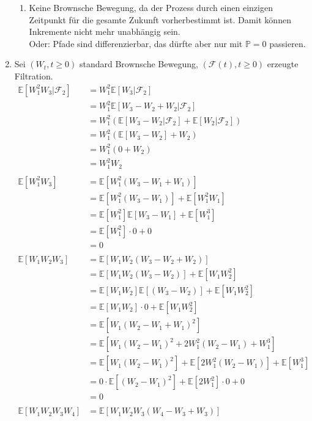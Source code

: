 \documentclass[a4paper,11pt,notitlepage,fullpage]{article}
\newcommand{\E}{\mathbb{E}}
\newcommand{\p}{\mathbb{P}}
\newcommand{\F}{\mathcal{F}}
\begin{document}
\begin{enumerate}
\begin{enumerate}
\item Keine Brownsche Bewegung, da der Prozess durch einen einzigen Zeitpunkt für die gesamte Zukunft vorherbestimmt ist. Damit können Inkremente nicht mehr unabhängig sein.\\
Oder: Pfade sind differenzierbar, das dürfte aber nur mit $\p=0$ passieren.
\end{enumerate}

\item Sei $(W_t, t\geq0)$ standard Brownsche Bewegung, $(\F(t), t\geq0)$ erzeugte Filtration.
\begin{align*}
\E[W_1^2W_3 | \F_2] &= W_1^2\E[W_3 | \F_2]  \\
&= W_1^2\E[W_3 -W_2 +W_2 | \F_2]  \\
&= W_1^2(\E[W_3 -W_2 | \F_2] +\E[W_2 | \F_2])  \\
&= W_1^2(\E[W_3 -W_2] +W_2)  \\
&= W_1^2(0 +W_2)  \\
&= W_1^2W_2  \\
\\
\E[W_1^2W_3] &= \E[W_1^2(W_3-W_1+W_1)]  \\
&= \E[W_1^2(W_3-W_1)]+\E[W_1^2W_1]  \\
&= \E[W_1^2]\E[W_3-W_1]+\E[W_1^3]  \\
&= \E[W_1^2] \cdot 0 + 0  \\
&= 0  \\
\\
\E[W_1W_2W_3] &= \E[W_1W_2(W_3-W_2+W_2)]  \\
&= \E[W_1W_2(W_3-W_2)]+\E[W_1W_2^2]  \\
&= \E[W_1W_2]\E[(W_3-W_2)]+\E[W_1W_2^2]  \\
&= \E[W_1W_2]\cdot0+\E[W_1W_2^2]  \\
&= \E[W_1(W_2-W_1+W_1)^2]  \\
&= \E[W_1(W_2-W_1)^2 + 2W_1^2 (W_2-W_1) + W_1^3]  \\
&= \E[W_1(W_2-W_1)^2] + \E[2W_1^2 (W_2-W_1)] + \E[W_1^3]  \\
&= 0 \cdot \E[(W_2-W_1)^2] + \E[2W_1^2]\cdot 0 + 0 \\
&= 0 \\
\\
\E[W_1W_2W_3W_4] &= \E[W_1W_2W_3(W_4-W_3+W_3)]  \\

\end{align*}
\end{enumerate}
\end{document}
